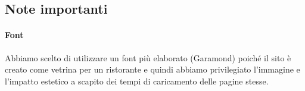 \subsection{Note importanti}

\paragraph{Font}

Abbiamo scelto di utilizzare un font più elaborato (Garamond) poiché il sito è creato come vetrina per un ristorante e quindi abbiamo privilegiato l’immagine e l’impatto estetico a scapito dei tempi di caricamento delle pagine stesse.
